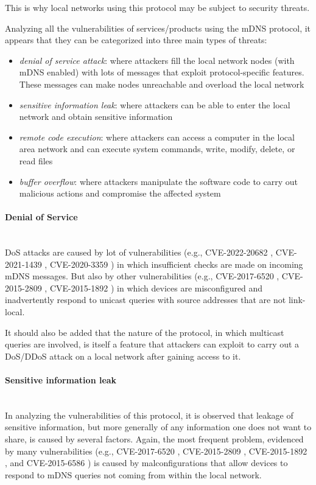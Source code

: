 \documentclass[fleqn, 11pt]{SelfArx} %
\begin{document}
This is why local networks using this protocol may be subject to security threats. 

Analyzing all the vulnerabilities of services/products using the mDNS protocol, it appears that they can be categorized into three main types of threats:
\begin{itemize}[leftmargin=*]
	\item {\it{denial of service attack}}: where attackers fill the local network nodes (with mDNS enabled) with lots of messages that exploit protocol-specific features. These messages can make nodes unreachable and overload the local network
	\item {\it{sensitive information leak}}: where attackers can be able to enter the local network and obtain sensitive information
	\item {\it{remote code execution}}: where attackers can access a computer in the local area network and can execute system commands, write, modify, delete, or read files
	\item {\it{buffer overflow}}: where attackers manipulate the software code to carry out malicious actions and compromise the affected system 
\end{itemize}

\paragraph{Denial of Service}\mbox{}\\
DoS attacks are caused by lot of vulnerabilities (e.g., CVE-2022-20682 \cite{CVE-2022-20682}, CVE-2021-1439 \cite{CVE-2021-1439}, CVE-2020-3359 \cite{CVE-2020-3359}) in which insufficient checks are made on incoming mDNS messages. But also by other vulnerabilities (e.g., CVE-2017-6520 \cite{CVE-2017-6520}, CVE-2015-2809 \cite{CVE-2015-2809}, CVE-2015-1892 \cite{CVE-2015-1892}) in which devices are misconfigured and inadvertently respond to unicast queries with source addresses that are not link-local.

It should also be added that the nature of the protocol, in which multicast queries are involved, is itself a feature that attackers can exploit to carry out a DoS/DDoS attack on a local network after gaining access to it. %

\paragraph{Sensitive information leak}\mbox{}\\
In analyzing the vulnerabilities of this protocol, it is observed that leakage of sensitive information, but more generally of any information one does not want to share, is caused by several factors. Again, the most frequent problem, evidenced by many vulnerabilities (e.g., CVE-2017-6520 \cite{CVE-2017-6520}, CVE-2015-2809 \cite{CVE-2015-2809}, CVE-2015-1892 \cite{CVE-2015-1892}, and CVE-2015-6586 \cite{CVE-2015-6586}) is caused by malconfigurations that allow devices to respond to mDNS queries not coming from within the local network. 
\end{document}
